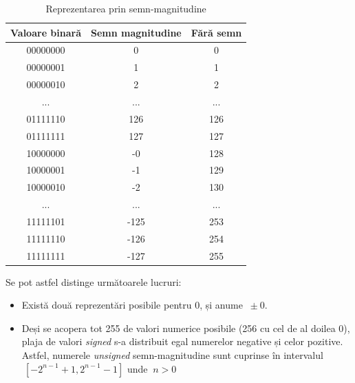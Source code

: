 \documentclass[12pt]{article}
\begin{document}
\newpage
\begin{table}[h]
\centering
\caption{Reprezentarea prin semn-magnitudine }
\label{Tabela:4}
\begin{tabular}{ ||c|c|c|| }
 \hline
 Valoare binară & Semn magnitudine &  Fără semn\\ 
 \hline  \hline
 00000000 & 0 & 0\\
 \hline
 00000001 & 1  & 1\\
 \hline
 00000010 &  2 & 2 \\
 \hline
  ... &  ... & ... \\
 \hline
 01111110 & 126 & 126 \\
 \hline
 01111111 & 127 & 127 \\
 \hline
 10000000 & -0 & 128 \\
 \hline
 10000001 & -1 & 129 \\
 \hline
 10000010 & -2 & 130 \\
 \hline
   ... &  ... & ... \\
 \hline
  11111101 & -125 & 253 \\
 \hline
 11111110 & -126 & 254 \\
 \hline
 11111111 & -127 & 255 \\
 \hline
\end{tabular}
\end{table}
Se pot astfel distinge următoarele lucruri:
\begin{itemize}
\item Există două reprezentări posibile pentru 0, și anume $\ \pm 0$.
\item Deși se acopera tot 255 de valori numerice posibile (256 cu cel de al doilea 0), plaja de valori \textit{signed} s-a distribuit egal numerelor negative și celor pozitive. Astfel, numerele \textit{unsigned} semn-magnitudine  sunt cuprinse în intervalul $\ [-2^{n-1}+1, 2^{n-1}-1]$ unde $\ n > 0$ 
\end{itemize}
\end{document}
